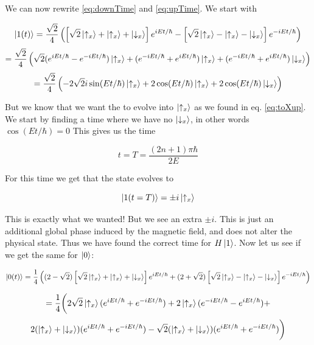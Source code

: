 \documentclass[a4paper,norsk, 10pt]{article}
\begin{document}
We can now rewrite \eqref{eq:downTime} and \eqref{eq:upTime}. We start with

\begin{equation*}
\ket{1(t)} = \frac{\sqrt{2}}{4}\left(\left[\sqrt{2}\ket{\uparrow_x} + \ket{\uparrow_x} + \ket{\downarrow_x}\right] e^{iEt/\hbar} - \left[\sqrt{2}\ket{\uparrow_x} - \ket{\uparrow_x} - \ket{\downarrow_x}\right]e^{-iEt/\hbar}\right)
\end{equation*}
\begin{equation*}
= \frac{\sqrt{2}}{4}\left(\sqrt{2}(e^{iEt/\hbar}- e^{-iEt/\hbar})\ket{\uparrow_x} + (e^{-iEt/\hbar}+ e^{iEt/\hbar})\ket{\uparrow_x} + (e^{-iEt/\hbar}+ e^{iEt/\hbar})\ket{\downarrow_x}\right)
\end{equation*}
\begin{equation}
=\frac{\sqrt{2}}{4}\left(-2\sqrt{2}i\sin(Et/\hbar)\ket{\uparrow_x} + 2\cos(Et/\hbar)\ket{\uparrow_x} +2 \cos(Et/\hbar)\ket{\downarrow_x}\right)
\end{equation}

But we know that we want the to evolve into $\ket{\uparrow_x}$ as we found in eq. \eqref{eq:toXup}. We start by finding a time where we have no $\ket{\downarrow_x}$, in other words $\cos(Et/\hbar) = 0$ This gives us the time

\begin{equation}
t = T = \frac{(2n + 1)\pi\hbar}{2E}
\end{equation}

For this time we get that the state evolves to

\begin{equation}
\ket{1(t = T)} = 
\pm i \ket{\uparrow_x}
\label{eq:upEvolved}
\end{equation}

This is exactly what we wanted! But we see an extra $\pm i$. This is just an additional global phase induced by the magnetic field, and does not alter the physical state. Thus we have found the correct time for $H\ket{1}$. Now let us see if we get the same for $\ket{0}$:

\begin{equation*}
\ket{0(t)} =
\frac{1}{4}\left((2-\sqrt{2})\left[\sqrt{2}\ket{\uparrow_x} + \ket{\uparrow_x} + \ket{\downarrow_x}\right] e^{iEt/\hbar} + (2+\sqrt{2})\left[\sqrt{2}\ket{\uparrow_x} - \ket{\uparrow_x} - \ket{\downarrow_x}\right]e^{-iEt/\hbar}\right)
\end{equation*}

\begin{equation*}
=\frac{1}{4}\bigg(2\sqrt{2}\ket{\uparrow_x}(e^{iEt/\hbar} + e^{-iEt/\hbar}) 
+ 2\ket{\uparrow_x}(e^{-iEt/\hbar} - e^{iEt/\hbar}) + 
\end{equation*}
\begin{equation*}
2(\ket{\uparrow_x} + \ket{\downarrow_x})(e^{iEt/\hbar} + e^{-iEt/\hbar}) 
-\sqrt{2}(\ket{\uparrow_x} + \ket{\downarrow_x})(e^{iEt/\hbar} + e^{-iEt/\hbar}) 
\bigg)
\end{equation*}
\end{document}
